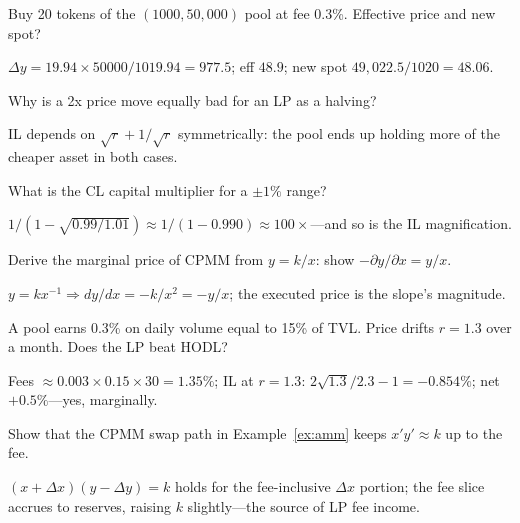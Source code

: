 \begin{exercise}[easy]
Buy 20 tokens of the $(1000,50{,}000)$ pool at fee 0.3\%. Effective price and new spot?
\end{exercise}
\begin{solution}
$\Delta y=19.94\times50000/1019.94=977.5$; eff $48.9$; new spot $49,022.5/1020=48.06$.
\end{solution}

\begin{exercise}[easy]
Why is a 2x price move equally bad for an LP as a halving?
\end{exercise}
\begin{solution}
IL depends on $\sqrt r + 1/\sqrt r$ symmetrically: the pool ends up holding more of the
cheaper asset in both cases.
\end{solution}

\begin{exercise}[easy]
What is the CL capital multiplier for a $\pm1\%$ range?
\end{exercise}
\begin{solution}
$1/(1-\sqrt{0.99/1.01})\approx1/(1-0.990)\approx100\times$---and so is the IL magnification.
\end{solution}

\begin{exercise}
Derive the marginal price of CPMM from $y=k/x$: show $-\partial y/\partial x = y/x$.
\end{exercise}
\begin{solution}
$y=kx^{-1}\Rightarrow dy/dx=-k/x^{2}=-y/x$; the executed price is the slope's magnitude.
\end{solution}

\begin{exercise}
A pool earns 0.3\% on daily volume equal to 15\% of TVL. Price drifts $r=1.3$ over a month.
Does the LP beat HODL?
\end{exercise}
\begin{solution}
Fees $\approx0.003\times0.15\times30=1.35\%$; IL at $r=1.3$: $2\sqrt{1.3}/2.3-1=-0.854\%$;
net $+0.5\%$---yes, marginally.
\end{solution}

\begin{exercise}
Show that the CPMM swap path in Example~\ref{ex:amm} keeps $x'y' \approx k$ up to the fee.
\end{exercise}
\begin{solution}
$(x+\Delta x)(y-\Delta y)=k$ holds for the fee-inclusive $\Delta x$ portion; the fee slice
accrues to reserves, raising $k$ slightly---the source of LP fee income.
\end{solution}

